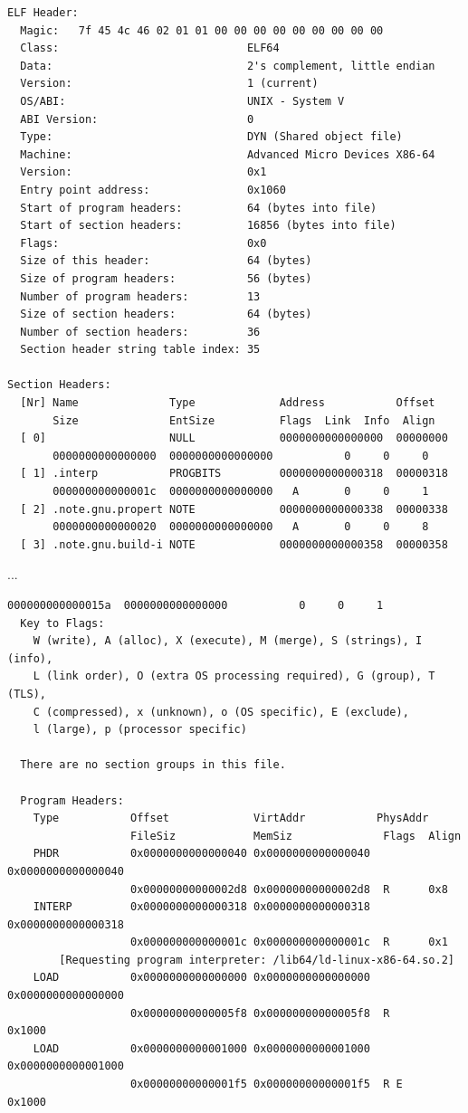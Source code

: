 \documentclass[]{project_plan}
\begin{document}
\begin{lstlisting}[basicstyle=\tiny]
  ELF Header:
  Magic:   7f 45 4c 46 02 01 01 00 00 00 00 00 00 00 00 00
  Class:                             ELF64
  Data:                              2's complement, little endian
  Version:                           1 (current)
  OS/ABI:                            UNIX - System V
  ABI Version:                       0
  Type:                              DYN (Shared object file)
  Machine:                           Advanced Micro Devices X86-64
  Version:                           0x1
  Entry point address:               0x1060
  Start of program headers:          64 (bytes into file)
  Start of section headers:          16856 (bytes into file)
  Flags:                             0x0
  Size of this header:               64 (bytes)
  Size of program headers:           56 (bytes)
  Number of program headers:         13
  Size of section headers:           64 (bytes)
  Number of section headers:         36
  Section header string table index: 35

Section Headers:
  [Nr] Name              Type             Address           Offset
       Size              EntSize          Flags  Link  Info  Align
  [ 0]                   NULL             0000000000000000  00000000
       0000000000000000  0000000000000000           0     0     0
  [ 1] .interp           PROGBITS         0000000000000318  00000318
       000000000000001c  0000000000000000   A       0     0     1
  [ 2] .note.gnu.propert NOTE             0000000000000338  00000338
       0000000000000020  0000000000000000   A       0     0     8
  [ 3] .note.gnu.build-i NOTE             0000000000000358  00000358

\end{lstlisting}
...
\begin{lstlisting}[basicstyle=\tiny]
  000000000000015a  0000000000000000           0     0     1
  Key to Flags:
    W (write), A (alloc), X (execute), M (merge), S (strings), I (info),
    L (link order), O (extra OS processing required), G (group), T (TLS),
    C (compressed), x (unknown), o (OS specific), E (exclude),
    l (large), p (processor specific)

  There are no section groups in this file.

  Program Headers:
    Type           Offset             VirtAddr           PhysAddr
                   FileSiz            MemSiz              Flags  Align
    PHDR           0x0000000000000040 0x0000000000000040 0x0000000000000040
                   0x00000000000002d8 0x00000000000002d8  R      0x8
    INTERP         0x0000000000000318 0x0000000000000318 0x0000000000000318
                   0x000000000000001c 0x000000000000001c  R      0x1
        [Requesting program interpreter: /lib64/ld-linux-x86-64.so.2]
    LOAD           0x0000000000000000 0x0000000000000000 0x0000000000000000
                   0x00000000000005f8 0x00000000000005f8  R      0x1000
    LOAD           0x0000000000001000 0x0000000000001000 0x0000000000001000
                   0x00000000000001f5 0x00000000000001f5  R E    0x1000
\end{lstlisting}
\end{document}

